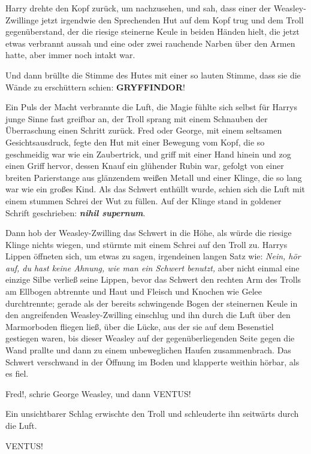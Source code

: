 Harry drehte den Kopf zurück, um nachzusehen, und sah, dass einer der
Weasley-Zwillinge jetzt irgendwie den Sprechenden Hut auf dem Kopf trug und dem
Troll gegenüberstand, der die riesige steinerne Keule in beiden Händen hielt,
die jetzt etwas verbrannt aussah und eine oder zwei rauchende Narben über den
Armen hatte, aber immer noch intakt war.

Und dann brüllte die Stimme des Hutes mit einer so lauten Stimme, dass sie die
Wände zu erschüttern schien: \glqq{}\textbf{GRYFFINDOR}!\grqq{}

Ein Puls der Macht verbrannte die Luft, die Magie fühlte sich selbst für Harrys
junge Sinne fast greifbar an, der Troll sprang mit einem Schnauben der
Überraschung einen Schritt zurück. Fred oder George, mit einem seltsamen
Gesichtsausdruck, fegte den Hut mit einer Bewegung vom Kopf, die so geschmeidig
war wie ein Zaubertrick, und griff mit einer Hand hinein und zog einen Griff
hervor, dessen Knauf ein glühender Rubin war, gefolgt von einer breiten
Parierstange aus glänzendem weißen Metall und einer Klinge, die so lang war wie
ein großes Kind. Als das Schwert enthüllt wurde, schien sich die Luft mit einem
stummen Schrei der Wut zu füllen. Auf der Klinge stand in goldener Schrift
geschrieben: \textbf{\emph{nihil supernum}}.

Dann hob der Weasley-Zwilling das Schwert in die Höhe, als würde die riesige
Klinge nichts wiegen, und stürmte mit einem Schrei auf den Troll zu. Harrys
Lippen öffneten sich, um etwas zu sagen, irgendeinen langen Satz wie:
\emph{Nein, hör auf, du hast keine Ahnung, wie man ein Schwert benutzt,} aber
nicht einmal eine einzige Silbe verließ seine Lippen, bevor das Schwert den
rechten Arm des Trolls am Ellbogen abtrennte und Haut und Fleisch und Knochen
wie Gelee durchtrennte; gerade als der bereits schwingende Bogen der steinernen
Keule in den angreifenden Weasley-Zwilling einschlug und ihn durch die Luft über
den Marmorboden fliegen ließ, über die Lücke, aus der sie auf dem Besenstiel
gestiegen waren, bis dieser Weasley auf der gegenüberliegenden Seite gegen die
Wand prallte und dann zu einem unbeweglichen Haufen zusammenbrach. Das Schwert
verschwand in der Öffnung im Boden und klapperte weithin hörbar, als es fiel.

\glqq{}Fred!\grqq{}, schrie George Weasley, und dann \glqq{}VENTUS!\grqq{}

Ein unsichtbarer Schlag erwischte den Troll und schleuderte ihn seitwärts durch
die Luft.

\glqq{}VENTUS!\grqq{}

